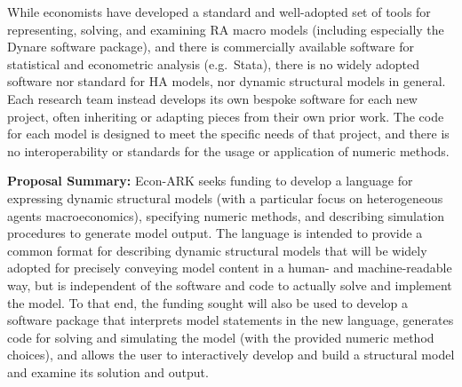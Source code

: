 \documentclass[12pt,pdftex,letterpaper]{article}
\begin{document}
While economists have developed a standard and well-adopted set of tools for representing, solving, and examining RA macro models (including especially the Dynare software package), and there is commercially available software for statistical and econometric analysis (e.g.\ Stata), there is no widely adopted software nor standard for HA models, nor dynamic structural models in general. Each research team instead develops its own bespoke software for each new project, often inheriting or adapting pieces from their own prior work. The code for each model is designed to meet the specific needs of that project, and there is no interoperability or standards for the usage or application of numeric methods.

\vspace{0.5cm}

\noindent \textbf{Proposal Summary:} Econ-ARK seeks funding to develop a language for expressing dynamic structural models (with a particular focus on heterogeneous agents macroeconomics), specifying numeric methods, and describing simulation procedures to generate model output. The language is intended to provide a common format for describing dynamic structural models that will be widely adopted for precisely conveying model content in a human- and machine-readable way, but is independent of the software and code to actually solve and implement the model. To that end, the funding sought will also be used to develop a software package that interprets model statements in the new language, generates code for solving and simulating the model (with the provided numeric method choices), and allows the user to interactively develop and build a structural model and examine its solution and output.
\end{document}
